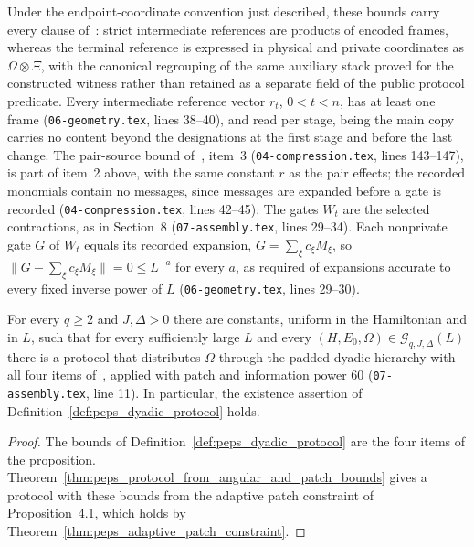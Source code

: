 \begin{definition}
    Under the endpoint-coordinate convention just described, these bounds carry
    every clause of~\cite[Proposition~7.1]{OpenAI2026PolynomialPEPS}: strict
    intermediate references are products of encoded frames, whereas the terminal
    reference is expressed in physical and private coordinates as
    $\Omega\otimes\Xi$, with the canonical regrouping of the same auxiliary stack
    proved for the constructed witness rather than retained as a separate field
    of the public protocol predicate. Every intermediate
    reference vector $r_t$, $0<t<n$, has at least one frame
    (\texttt{06-geometry.tex}, lines 38--40), and read per stage, being the
    main copy carries no content beyond the designations at the first stage and
    before the last change. The pair-source bound
    of~\cite[Theorem~5.2]{OpenAI2026PolynomialPEPS}, item~3
    (\texttt{04-compression.tex}, lines 143--147), is part of item~2 above, with
    the same constant $r$ as the pair effects; the recorded monomials contain no
    messages, since messages are expanded before a gate is recorded
    (\texttt{04-compression.tex}, lines 42--45). The gates $W_t$ are the
    selected contractions, as in Section~8 (\texttt{07-assembly.tex}, lines
    29--34). Each nonprivate gate $G$ of $W_t$ equals its recorded expansion,
    $G=\sum_\xi c_\xi M_\xi$, so
    $\lVert G-\sum_\xi c_\xi M_\xi\rVert=0\le L^{-a}$ for every $a$, as
    required of expansions accurate to every fixed inverse power of $L$
    (\texttt{06-geometry.tex}, lines 29--30).
\end{definition}

\begin{lemma}
    \label{prop:peps_dyadic_protocol}
    \leanok
    For every $q\ge2$ and $J,\Delta>0$ there are constants, uniform in the
    Hamiltonian and in $L$, such that for every sufficiently large $L$ and every
    $(H,E_0,\Omega)\in\mathcal G_{q,J,\Delta}(L)$ there is a protocol that
    distributes $\Omega$ through the padded dyadic hierarchy with all four items
    of~\cite[Proposition~7.1]{OpenAI2026PolynomialPEPS}, applied with patch and
    information power $60$ (\texttt{07-assembly.tex}, line 11). In particular,
    the existence assertion of Definition~\ref{def:peps_dyadic_protocol} holds.
\end{lemma}

\begin{proof}\leanok
    The bounds of Definition~\ref{def:peps_dyadic_protocol} are the four items
    of the proposition. Theorem~\ref{thm:peps_protocol_from_angular_and_patch_bounds}
    gives a protocol with these bounds from the adaptive patch constraint of
    Proposition~4.1, which holds by Theorem~\ref{thm:peps_adaptive_patch_constraint}.
\end{proof}


